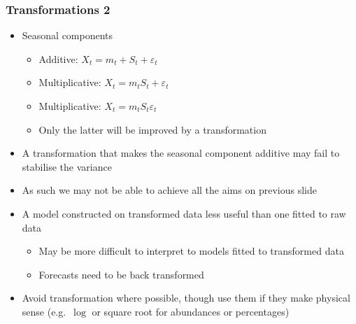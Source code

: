 \documentclass{beamer}
\begin{document}
\begin{frame}
\frametitle{Transformations 2}
    \begin{itemize}
        \item Seasonal components
        \begin{itemize}
            \item Additive: $X_t = m_t + S_t + \varepsilon_t$
            \item Multiplicative: $X_t = m_t S_t + \varepsilon_t$
            \item Multiplicative: $X_t = m_t S_t \varepsilon_t$
            \item Only the latter will be improved by a transformation
        \end{itemize}
        \item A transformation that makes the seasonal component additive may fail to stabilise the variance
        \item As such we may not be able to achieve all the aims on previous slide
        \item A model constructed on transformed data less useful than one fitted to raw data
        \begin{itemize}
            \item May be more difficult to interpret to models fitted to transformed data
            \item Forecasts need to be back transformed
        \end{itemize}
        \item Avoid transformation where possible, though use them if they make physical sense (e.g.~$\log$ or square root for abundances or percentages)
    \end{itemize}
\end{frame}

\end{document}
